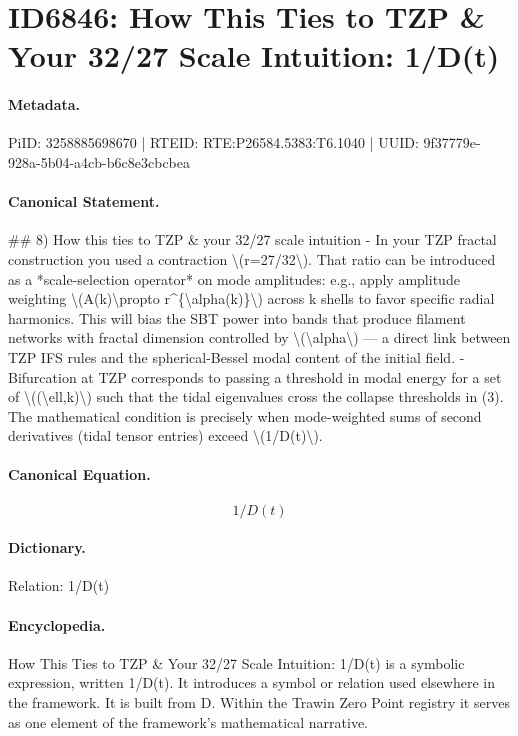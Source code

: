 \section*{ID6846: How This Ties to TZP \& Your 32/27 Scale Intuition: 1/D(t)}
\paragraph{Metadata.}
PiID: 3258885698670 | RTEID: RTE:P26584.5383:T6.1040 | UUID: 9f37779e-928a-5b04-a4cb-b6c8e3cbcbea

\paragraph{Canonical Statement.}
\#\# 8) How this ties to TZP \& your 32/27 scale intuition - In your TZP fractal construction you used a contraction \textbackslash{}(r=27/32\textbackslash{}). That ratio can be introduced as a *scale-selection operator* on mode amplitudes: e.g., apply amplitude weighting \textbackslash{}(A(k)\textbackslash{}propto r\textasciicircum{}\{\textbackslash{}alpha(k)\}\textbackslash{}) across k shells to favor specific radial harmonics. This will bias the SBT power into bands that produce filament networks with fractal dimension controlled by \textbackslash{}(\textbackslash{}alpha\textbackslash{}) — a direct link between TZP IFS rules and the spherical-Bessel modal content of the initial field. - Bifurcation at TZP corresponds to passing a threshold in modal energy for a set of \textbackslash{}((\textbackslash{}ell,k)\textbackslash{}) such that the tidal eigenvalues cross the collapse thresholds in (3). The mathematical condition is precisely when mode-weighted sums of second derivatives (tidal tensor entries) exceed \textbackslash{}(1/D(t)\textbackslash{}).

\paragraph{Canonical Equation.}
\[
1/D(t)
\]

\paragraph{Dictionary.}
Relation: 1/D(t)

\paragraph{Encyclopedia.}
How This Ties to TZP \& Your 32/27 Scale Intuition: 1/D(t) is a symbolic expression, written 1/D(t). It introduces a symbol or relation used elsewhere in the framework. It is built from D. Within the Trawin Zero Point registry it serves as one element of the framework's mathematical narrative.
